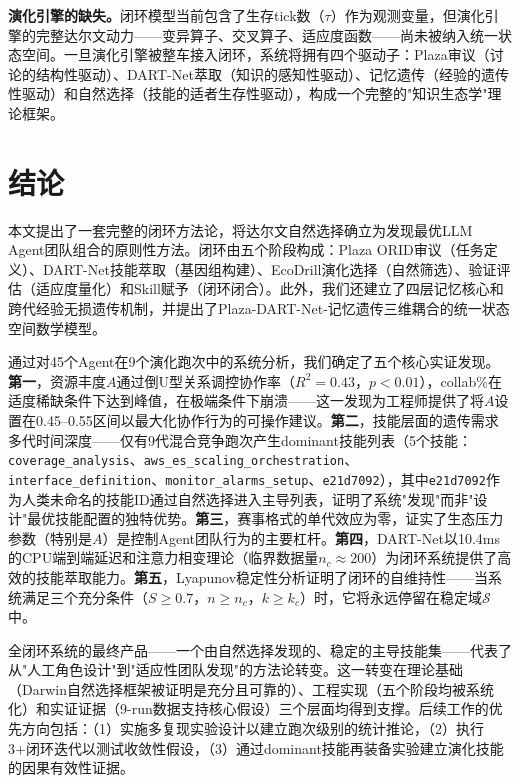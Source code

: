 \documentclass[12pt,a4paper]{ctexart}
\begin{document}
\textbf{演化引擎的缺失。}闭环模型当前包含了生存tick数（$\tau$）作为观测变量，但演化引擎的完整达尔文动力——变异算子、交叉算子、适应度函数——尚未被纳入统一状态空间。一旦演化引擎被整车接入闭环，系统将拥有四个驱动子：Plaza审议（讨论的结构性驱动）、DART-Net萃取（知识的感知性驱动）、记忆遗传（经验的遗传性驱动）和自然选择（技能的适者生存性驱动），构成一个完整的"知识生态学"理论框架。

\section{结论}

本文提出了一套完整的闭环方法论，将达尔文自然选择确立为发现最优LLM Agent团队组合的原则性方法。闭环由五个阶段构成：Plaza ORID审议（任务定义）、DART-Net技能萃取（基因组构建）、EcoDrill演化选择（自然筛选）、验证评估（适应度量化）和Skill赋予（闭环闭合）。此外，我们还建立了四层记忆核心和跨代经验无损遗传机制，并提出了Plaza-DART-Net-记忆遗传三维耦合的统一状态空间数学模型。

通过对45个Agent在9个演化跑次中的系统分析，我们确定了五个核心实证发现。\textbf{第一}，资源丰度$A$通过倒U型关系调控协作率（$R^2=0.43$，$p<0.01$），collab\%在适度稀缺条件下达到峰值，在极端条件下崩溃——这一发现为工程师提供了将$A$设置在0.45--0.55区间以最大化协作行为的可操作建议。\textbf{第二}，技能层面的遗传需求多代时间深度——仅有9代混合竞争跑次产生dominant技能列表（5个技能：\texttt{coverage\_analysis}、\texttt{aws\_es\_scaling\_orchestration}、\texttt{interface\_definition}、\texttt{monitor\_alarms\_setup}、\texttt{e21d7092}），其中\texttt{e21d7092}作为人类未命名的技能ID通过自然选择进入主导列表，证明了系统"发现"而非"设计"最优技能配置的独特优势。\textbf{第三}，赛事格式的单代效应为零，证实了生态压力参数（特别是$A$）是控制Agent团队行为的主要杠杆。\textbf{第四}，DART-Net以10.4ms的CPU端到端延迟和注意力相变理论（临界数据量$n_c \approx 200$）为闭环系统提供了高效的技能萃取能力。\textbf{第五}，Lyapunov稳定性分析证明了闭环的自维持性——当系统满足三个充分条件（$S \geq 0.7$，$n \geq n_c$，$k \geq k_c$）时，它将永远停留在稳定域$\mathcal{S}$中。

全闭环系统的最终产品——一个由自然选择发现的、稳定的主导技能集——代表了从"人工角色设计"到"适应性团队发现"的方法论转变。这一转变在理论基础（Darwin自然选择框架被证明是充分且可靠的）、工程实现（五个阶段均被系统化）和实证证据（9-run数据支持核心假设）三个层面均得到支撑。后续工作的优先方向包括：（1）实施多复现实验设计以建立跑次级别的统计推论，（2）执行3+闭环迭代以测试收敛性假设，（3）通过dominant技能再装备实验建立演化技能的因果有效性证据。
\end{document}
